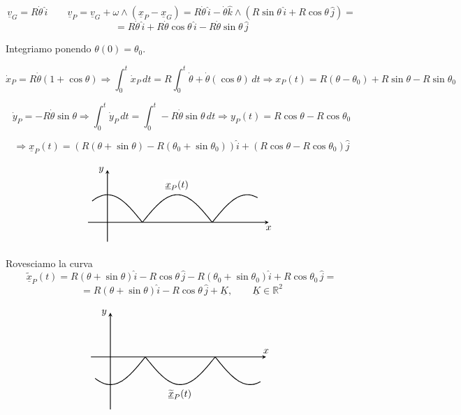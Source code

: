 \[
\underline{v}_G = R\dot{\theta}\,\widehat{i}
\qquad
\underline{v}_P =
\underline{v}_G + \omega \wedge (\underline{x}_P-\underline{x}_G)
=
R\dot{\theta}\,\widehat{i}
-
\dot{\theta}\widehat{k}\wedge
\left(R\sin\theta\,\widehat{i}+R\cos\theta\,\widehat{j}\right)
=
\]
\[
=
R\dot{\theta}\,\widehat{i}
+
R\dot{\theta}\cos\theta\,\widehat{i}
-
R\dot{\theta}\sin\theta\,\widehat{j}
\]

Integriamo ponendo \(\theta(0)=\theta_0\).

\[
\dot{x}_P = R\dot{\theta}(1+\cos\theta)
\Rightarrow
\int_0^t \dot{x}_P\,dt
=
R\int_0^t \dot{\theta}+\dot{\theta}(\cos\theta)\,dt
\Rightarrow
x_P(t)=R(\theta-\theta_0)+R\sin\theta-R\sin\theta_0
\]

\[
\dot{y}_P=-R\dot{\theta}\sin\theta
\Rightarrow
\int_0^t \dot{y}_P\,dt
=
\int_0^t -R\dot{\theta}\sin\theta\,dt
\Rightarrow
y_P(t)=R\cos\theta-R\cos\theta_0
\]

\[
\Rightarrow
\underline{x}_P(t)
=
\left(R(\theta+\sin\theta)-R(\theta_0+\sin\theta_0)\right)\widehat{i}
+
\left(R\cos\theta-R\cos\theta_0\right)\widehat{j}
\]

\[
\begin{tikzpicture}[>=stealth]
  \draw[thick, ->] (0,-0.7) -- (0,1.9) node[left] {\(y\)};
  \draw[thick, ->] (-0.7,0) -- (5.8,0) node[below] {\(x\)};

  \draw[thick, domain=-0.55:5.4, samples=200, smooth]
    plot ({\x},{abs(cos(deg(1.25*\x)))});

  \node[fill=white, inner sep=1.5pt] at (2.5, 1.35) {\(\underline{x}_P(t)\)};
\end{tikzpicture}
\]

Rovesciamo la curva
\[
\widetilde{\underline{x}}_P(t)
=
R(\theta+\sin\theta)\widehat{i}
-
R\cos\theta\,\widehat{j}
-
R(\theta_0+\sin\theta_0)\widehat{i}
+
R\cos\theta_0\,\widehat{j}
=
\]
\[
=
R(\theta+\sin\theta)\widehat{i}
-
R\cos\theta\,\widehat{j}
+
\underline{K},
\qquad
\underline{K}\in\mathbb{R}^2
\]

\[
\begin{tikzpicture}[>=stealth]
  \draw[thick, ->] (0,-1.9) -- (0,1.6) node[left] {\(y\)};
  \draw[thick, ->] (-0.7,0) -- (5.6,0) node[above] {\(x\)};

  \draw[thick, domain=-0.55:5.4, samples=200, smooth]
    plot ({\x},{-abs(cos(deg(1.25*\x)))});

  \node[fill=white, inner sep=1.5pt] at (2.5, -1.35) {\(\widetilde{\underline{x}}_P(t)\)};
\end{tikzpicture}
\]

